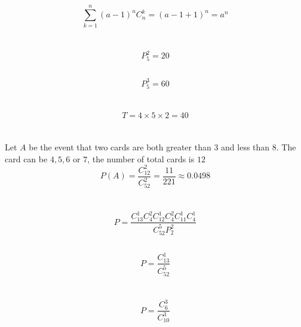 \documentclass{article}
\begin{document}
        \subsection{}
                $$\sum _{k=1}^{n}(a-1)^nC_n ^k=(a-1+1)^n=a^n$$
    
    \section{}
        \subsection{}
                $$P_5 ^2 =20$$
        \subsection{}
                $$P_5 ^3=60$$
    
    \section{}
        $$T=4\times 5\times 2=40$$
    
    \section{}
        Let $A$ be the event that two cards are both greater than $3$ and less than $8$.
        The card can be $4,5,6$ or $7$, the number of total cards is $12$
        $$P(A)= \frac{C_{12} ^ 2}{C_{52} ^ 2}=\frac{11}{221}\approx 0.0498$$

    \section{}
        \subsection{}
                $$P=\frac{C_{13}^1C_4^2C_{12}^1C_4^2C_{11}^1C_4^1}{C_{52}^5P_2^2}$$
        
        \subsection{}
                $$P=\frac{C_{13}^1}{C_{52}^5}$$

    \section{}
        \subsection{}
                $$P=\frac{C_6^3}{C_{10}^3}$$
        
\end{document}
